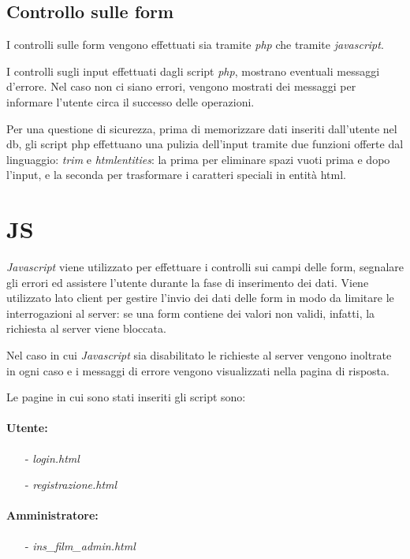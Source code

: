 \documentclass[a4paper]{article}
\begin{document}
\subsection{Controllo sulle form}

I controlli sulle form vengono effettuati sia tramite \textit{php} che tramite \textit{javascript}.

I controlli sugli input effettuati dagli script \textit{php}, mostrano eventuali messaggi d'errore. Nel caso non ci siano errori, vengono mostrati dei messaggi per informare l'utente circa il successo delle operazioni.

Per una questione di sicurezza, prima di memorizzare dati inseriti dall'utente nel db, gli script php effettuano una pulizia dell'input tramite due funzioni offerte dal linguaggio: \textit{trim} e \textit{htmlentities}: la prima per eliminare spazi vuoti prima e dopo l'input, e la seconda per trasformare i caratteri speciali in entità html.

\section{JS}
\textit{Javascript} viene utilizzato per effettuare i controlli sui campi delle form, segnalare gli errori ed assistere l'utente durante la fase di inserimento dei dati.
Viene utilizzato lato client per gestire l'invio dei dati delle form in modo da limitare le interrogazioni al server: se una form contiene dei valori non validi, infatti, la richiesta al server viene bloccata.

Nel caso in cui \textit{Javascript} sia disabilitato le richieste al server vengono inoltrate in ogni caso e i messaggi di errore vengono visualizzati nella pagina di risposta.

Le pagine in cui sono stati inseriti gli script sono:

\paragraph{Utente:}
\begin{itemize}
    \item[-] \textit{login.html}
    \item[-] \textit{registrazione.html}
\end{itemize}

\paragraph{Amministratore:}
\begin{itemize}
    \item[-]  \textit{ins\_film\_admin.html}
\end{itemize}
\end{document}
